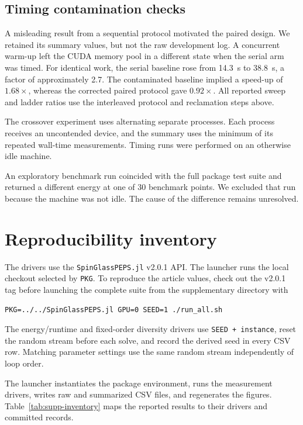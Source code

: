 \subsection{Timing contamination checks}

A misleading result from a sequential protocol motivated the paired design. We
retained its summary values, but not the raw development log. A concurrent
warm-up left the CUDA memory pool in a different state when the serial arm was
timed.
For identical work, the serial baseline rose from 14.3~s to 38.8~s, a factor of
approximately 2.7. The contaminated baseline implied a speed-up of
$1.68\times$, whereas the corrected paired protocol gave $0.92\times$. All
reported sweep and ladder ratios use the interleaved protocol and reclamation
steps above.

The crossover experiment uses alternating separate processes. Each process
receives an uncontended device, and the summary uses the minimum of its repeated
wall-time measurements. Timing runs were performed on an otherwise idle
machine.

An exploratory benchmark run coincided with the full package test suite and
returned a different energy at one of 30 benchmark points. We excluded that run
because the machine was not idle. The cause of the difference remains unresolved.
\FloatBarrier

\section{Reproducibility inventory}
\label{sec:supp-reproducibility}

The drivers use the \texttt{SpinGlassPEPS.jl} v2.0.1 API. The launcher runs the
local checkout selected by \texttt{PKG}. To reproduce the article values, check
out the v2.0.1 tag before launching the complete suite from the supplementary
\suppdatadir{} directory with

\begin{verbatim}
PKG=../../SpinGlassPEPS.jl GPU=0 SEED=1 ./run_all.sh
\end{verbatim}

The energy/runtime and fixed-order diversity drivers use
\texttt{SEED + instance}, reset the random stream before each solve, and record
the derived seed in every CSV row. Matching parameter settings use the same
random stream independently of loop order.

The launcher instantiates the package environment, runs the measurement drivers,
writes raw and summarized CSV files, and regenerates the figures.
Table~\ref{tab:supp-inventory} maps the reported results to their drivers and
committed records.

